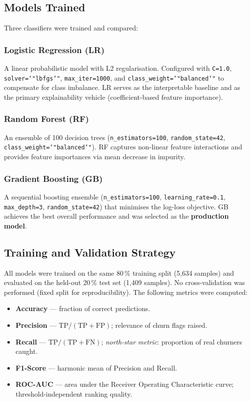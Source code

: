 \documentclass[conference]{IEEEtran}
\begin{document}
\subsection{Models Trained}

Three classifiers were trained and compared:

\subsubsection*{Logistic Regression (LR)}
A linear probabilistic model with L2 regularisation. Configured with
\texttt{C=1.0}, \texttt{solver=\char`"lbfgs\char`"},
\texttt{max\_iter=1000}, and
\texttt{class\_weight=\char`"balanced\char`"} to compensate for class
imbalance. LR serves as the interpretable baseline and as the primary
explainability vehicle (coefficient-based feature importance).

\subsubsection*{Random Forest (RF)}
An ensemble of 100 decision trees (\texttt{n\_estimators=100},
\texttt{random\_state=42},
\texttt{class\_weight=\char`"balanced\char`"}).
RF captures non-linear feature interactions and provides feature
importances via mean decrease in impurity.

\subsubsection*{Gradient Boosting (GB)}
A sequential boosting ensemble
(\texttt{n\_estimators=100}, \texttt{learning\_rate=0.1},
\texttt{max\_depth=3}, \texttt{random\_state=42}) that minimises the
log-loss objective. GB achieves the best overall performance and was
selected as the \textbf{production model}.

\subsection{Training and Validation Strategy}

All models were trained on the same 80\,\% training split (5,634 samples)
and evaluated on the held-out 20\,\% test set (1,409 samples). No
cross-validation was performed (fixed split for reproducibility). The
following metrics were computed:

\begin{itemize}
  \item \textbf{Accuracy} — fraction of correct predictions.
  \item \textbf{Precision} — $\text{TP}/(\text{TP}+\text{FP})$; relevance
        of churn flags raised.
  \item \textbf{Recall} — $\text{TP}/(\text{TP}+\text{FN})$;
        \textit{north-star metric}: proportion of real churners caught.
  \item \textbf{F1-Score} — harmonic mean of Precision and Recall.
  \item \textbf{ROC-AUC} — area under the Receiver Operating
        Characteristic curve; threshold-independent ranking quality.
\end{itemize}
\end{document}
